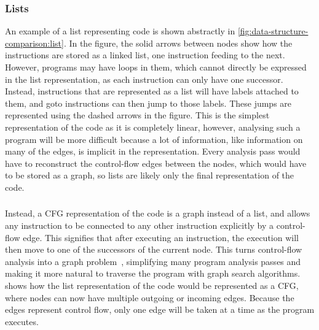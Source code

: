 \subsubsection{Lists}

An example of a list representing code is shown abstractly in
\cref{fig:data-structure-comparison:list}.  In the figure, the solid arrows
between nodes show how the instructions are stored as a linked list, one
instruction feeding to the next.  However, programs may have loops in them,
which cannot directly be expressed in the list representation, as each
instruction can only have one successor.  Instead, instructions that are
represented as a list will have labels attached to them, and goto instructions
can then jump to those labels.  These jumps are represented using the dashed
arrows in the figure.  This is the simplest representation of the code as it is
completely linear, however, analysing such a program will be more difficult
because a lot of information, like information on many of the edges, is implicit
in the representation.  Every analysis pass would have to reconstruct the
control-flow edges between the nodes, which would have to be stored as a graph,
so lists are likely only the final representation of the code.

\subsubsection{}

Instead, a \gls{CFG} representation of the code is a graph instead of a list,
and allows any instruction to be connected to any other instruction explicitly
by a control-flow edge.  This signifies that after executing an instruction, the
execution will then move to one of the successors of the current node.  This
turns control-flow analysis into a graph problem~\cite[]{allen70_cfa},
simplifying many program analysis passes and making it more natural to traverse
the program with graph search algorithms.
 shows how the list representation of
the code would be represented as a \gls{CFG}, where nodes can now have multiple
outgoing or incoming edges.  Because the edges represent \gls{control flow},
only one edge will be taken at a time as the program executes.

\subsubsection{}

